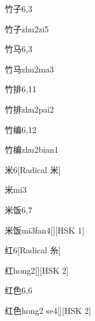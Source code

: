 \begin{entry}{竹子}{6,3}
  \begin{phonetics}{竹子}{zhu2zi5}
  \end{phonetics}
\end{entry}

\begin{entry}{竹马}{6,3}
  \begin{phonetics}{竹马}{zhu2ma3}
  \end{phonetics}
\end{entry}

\begin{entry}{竹排}{6,11}
  \begin{phonetics}{竹排}{zhu2pai2}
  \end{phonetics}
\end{entry}

\begin{entry}{竹编}{6,12}
  \begin{phonetics}{竹编}{zhu2bian1}
  \end{phonetics}
\end{entry}

\begin{entry}{米}{6}[Radical 米]
  \begin{phonetics}{米}{mi3}
  \end{phonetics}
\end{entry}

\begin{entry}{米饭}{6,7}
  \begin{phonetics}{米饭}{mi3fan4}[][HSK 1]
  \end{phonetics}
\end{entry}

\begin{entry}{红}{6}[Radical 糸]
  \begin{phonetics}{红}{hong2}[][HSK 2]
  \end{phonetics}
\end{entry}

\begin{entry}{红色}{6,6}
  \begin{phonetics}{红色}{hong2 se4}[][HSK 2]
  \end{phonetics}
\end{entry}

